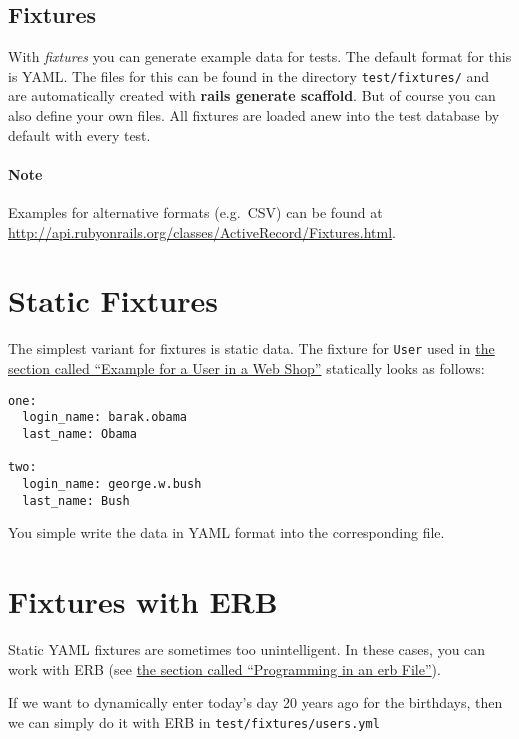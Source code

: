 \documentclass[a4paper]{book}
\newcounter{tab}[chapter]
\begin{document}
\subsection{Fixtures}\label{fixtures}

With \emph{fixtures} you can generate example data for tests. The default format for this is YAML. The files for this can be found in the directory \texttt{test/fixtures/} and are automatically created with \textbf{rails generate scaffold}. But of course you can also define your own files. All fixtures are loaded anew into the test database by default with every test.

\paragraph{Note}\label{note-42}

Examples for alternative formats (e.g.~CSV) can be found at \url{http://api.rubyonrails.org/classes/ActiveRecord/Fixtures.html}.

\section{Static Fixtures}\label{static-fixtures}

The simplest variant for fixtures is static data. The fixture for \texttt{User} used in \hyperref[testingux5fbeispielux5fwebshop]{the section called “Example for a User in a Web Shop”} statically looks as follows:

\begin{shaded}\begin{verbatim}
one:
  login_name: barak.obama
  last_name: Obama

two:
  login_name: george.w.bush
  last_name: Bush
\end{verbatim}\end{shaded}

You simple write the data in YAML format into the corresponding file.

\section{Fixtures with ERB}\label{fixtures-with-erb}

Static YAML fixtures are sometimes too unintelligent. In these cases, you can work with ERB (see \hyperref[erb-programmieren]{the section called “Programming in an erb File”}).

If we want to dynamically enter today's day 20 years ago for the birthdays, then we can simply do it with ERB in \texttt{test/fixtures/users.yml}
\end{document}

